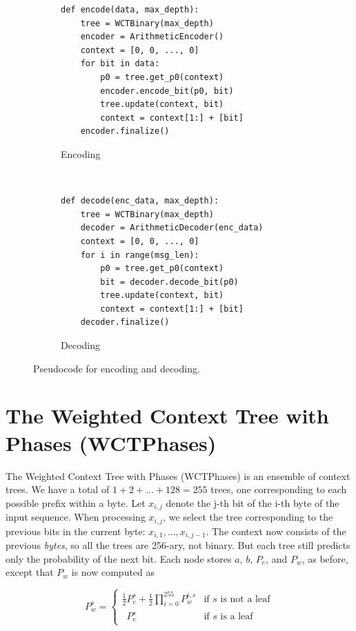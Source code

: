 \documentclass[11pt]{scrartcl}
\begin{document}
\begin{figure}[h!]
    \centering
    \begin{subfigure}[b]{0.5\textwidth}
\begin{verbatim}
def encode(data, max_depth):
    tree = WCTBinary(max_depth)
    encoder = ArithmeticEncoder()
    context = [0, 0, ..., 0]
    for bit in data:
        p0 = tree.get_p0(context)
        encoder.encode_bit(p0, bit)
        tree.update(context, bit)
        context = context[1:] + [bit]
    encoder.finalize() \end{verbatim}
        \caption{Encoding}
    \end{subfigure}
    ~
    \begin{subfigure}[b]{0.45\textwidth}
\begin{verbatim}
def decode(enc_data, max_depth):
    tree = WCTBinary(max_depth)
    decoder = ArithmeticDecoder(enc_data)
    context = [0, 0, ..., 0]
    for i in range(msg_len):
        p0 = tree.get_p0(context)
        bit = decoder.decode_bit(p0)
        tree.update(context, bit)
        context = context[1:] + [bit]
    decoder.finalize() \end{verbatim}
        \caption{Decoding}
    \end{subfigure}
    \caption{Pseudocode for encoding and decoding.}
    \label{fig:enc-dec}
\end{figure}


\section{The Weighted Context Tree with Phases (WCTPhases)}
\label{sec:wct-phases}

The Weighted Context Tree with Phases (WCTPhases) is an ensemble of context
trees. We have a total of $1 + 2 + ... + 128 = 255$ trees, one corresponding to
each possible prefix within a byte. Let $x_{i,j}$ denote the j-th bit of the
i-th byte of the input sequence.  When processing $x_{i,j}$, we select the tree
corresponding to the previous bits in the current byte: $x_{i,1}, ...,
x_{i,j-1}$. The context now consists of the previous {\em bytes}, so all the
trees are 256-ary, not binary. But each tree still predicts only the
probability of the next bit. Each node stores $a$, $b$, $P_e$, and $P_w$, as
before, except that $P_w$ is now computed as

\[
P_w^s =
\left\{
\begin{array}{ll}
\frac{1}{2} P_e^s + \frac{1}{2} \prod_{i=0}^{255}{ P_w^{i,s} }
    & \mbox{if $s$ is not a leaf} \\
\phantom{\frac{1}{2}} P_e^s
    & \mbox{if $s$ is a leaf}
\end{array}
\right.
\]
\end{document}
